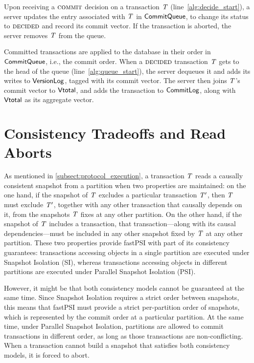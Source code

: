 Upon receiving a $\text{\sc commit}$ decision on a transaction $\mathit{T}$ (line~\ref{alg:decide_start}), a server updates the entry associated with $\mathit{T}$ in $\mathsf{CommitQueue}$, to change its status to $\text{\sc decided}$ and record its commit vector. If the transaction is aborted, the server removes $\mathit{T}$ from the queue.

Committed transactions are applied to the database in their order in $\mathsf{CommitQueue}$, i.e., the commit order. When a $\text{\sc decided}$ transaction $\mathit{T}$ gets to the head of the queue (line~\ref{alg:queue_start}), the server dequeues it and adds its writes to $\mathsf{VersionLog}$, tagged with its commit vector. The server then joins $\mathit{T}$'s commit vector to $\mathsf{Vtotal}$, and adds the transaction to $\mathsf{CommitLog}$, along with $\mathsf{Vtotal}$ as its aggregate vector.

\section{Consistency Tradeoffs and Read Aborts}
\label{sect:read_aborts}

As mentioned in \ref{subsect:protocol_execution}, a transaction $\mathit{T}$ reads a causally consistent snapshot from a partition when two properties are maintained: on the one hand, if the snapshot of $\mathit{T}$ excludes a particular transaction $\mathit{T}'$, then $\mathit{T}$ must exclude $\mathit{T}'$, together with any other transaction that causally depends on it, from the snapshots $\mathit{T}$ fixes at any other partition. On the other hand, if the snapshot of $\mathit{T}$ includes a transaction, that transaction---along with its causal dependencies---must be included in any other snapshot fixed by $\mathit{T}$ at any other partition. These two properties provide fastPSI with part of its consistency guarantees: transactions accessing objects in a single partition are executed under Snapshot Isolation (SI), whereas transactions accessing objects in different partitions are executed under Parallel Snapshot Isolation (PSI).

However, it might be that both consistency models cannot be guaranteed at the same time. Since Snapshot Isolation requires a strict order between snapshots, this means that fastPSI must provide a strict per-partition order of snapshots, which is represented by the commit order at a particular partition. At the same time, under Parallel Snapshot Isolation, partitions are allowed to commit transactions in different order, as long as those transactions are non-conflicting. When a transaction cannot build a snapshot that satisfies both consistency models, it is forced to abort.

